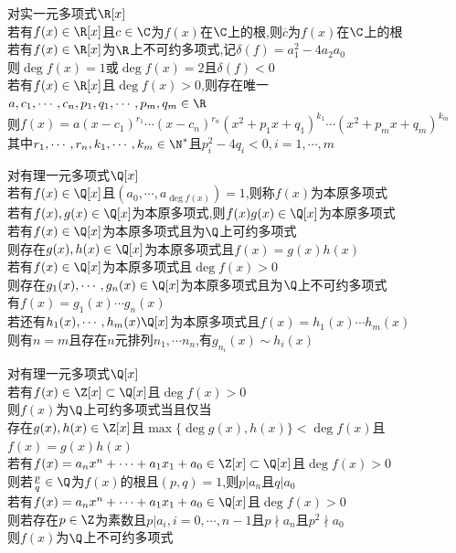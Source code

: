 \begin{dingli}
对实一元多项式$\R[x]$\\
若有$f(x)\in\R[x]$且$c\in\C$为$f(x)$在$\C$上的根,则$\overline{c}$为$f(x)$在$\C$上的根\\
若有$f(x)\in\R[x]$为$\R$上不可约多项式,记$\delta(f)=a_1^2-4a_2a_0$\\
则$\deg f(x)=1$或$\deg f(x)=2$且$\delta(f)<0$\\
若有$f(x)\in \R[x]$且$\deg f(x)>0$,则存在唯一$a,c_1,\cdots,c_n,p_1,q_1,\cdots,p_m,q_m\in\R$\\
则$f(x)=a(x-c_1)^{r_1}\cdots(x-c_n)^{r_n}(x^2+p_1x+q_1)^{k_1}\cdots(x^2+p_mx+q_m)^{k_m}$\\
其中$r_1,\cdots,r_n,k_1,\cdots,k_m\in\N^*$且$p_i^2-4q_i<0, i=1,\cdots,m$
\end{dingli}

\begin{dingli}
对有理一元多项式$\Q[x]$\\
若有$f(x)\in\Q[x]$且$(a_0,\cdots,a_{\deg f(x)})=1$,则称$f(x)$为本原多项式\\
若有$f(x),g(x)\in\Q[x]$为本原多项式,则$f(x)g(x)\in\Q[x]$为本原多项式\\
若有$f(x)\in\Q[x]$为本原多项式且为$\Q$上可约多项式\\
则存在$g(x),h(x)\in\Q[x]$为本原多项式且$f(x)=g(x)h(x)$\\
若有$f(x)\in\Q[x]$为本原多项式且$\deg f(x)>0$\\
则存在$g_1(x),\cdots,g_n(x)\in \Q[x]$为本原多项式且为$\Q$上不可约多项式\\
有$f(x)=g_1(x)\cdots g_n(x)$\\
若还有$h_1(x),\cdots,h_m(x)\Q[x]$为本原多项式且$f(x)=h_1(x)\cdots h_m(x)$\\
则有$n=m$且存在$n$元排列$n_1,\cdots n_n$,有$g_{n_i}(x)\sim h_{i}(x)$
\end{dingli}

\begin{dingli}
对有理一元多项式$\Q[x]$\\
若有$f(x)\in\Z[x]\subset\Q[x]$且$\deg f(x)>0$\\
则$f(x)$为$\Q$上可约多项式当且仅当\\
存在$g(x),h(x)\in\Z[x]$且$\max\{\deg g(x),h(x)\}<\deg f(x)$且$f(x)=g(x)h(x)$\\
若有$f(x)=a_nx^n+\cdots+a_1x_1+a_0\in\Z[x]\subset\Q[x]$且$\deg f(x)>0$\\
则若$\frac{p}{q}\in\Q$为$f(x)$的根且$(p,q)=1$,则$p|a_n$且$q|a_0$\\
若有$f(x)=a_nx^n+\cdots+a_1x_1+a_0\in\Q[x]$且$\deg f(x)>0$\\
则若存在$p\in\Z$为素数且$p|a_i, i=0,\cdots,n-1$且$p\nmid a_n$且$p^2\nmid a_0$\\
则$f(x)$为$\Q$上不可约多项式
\end{dingli}

